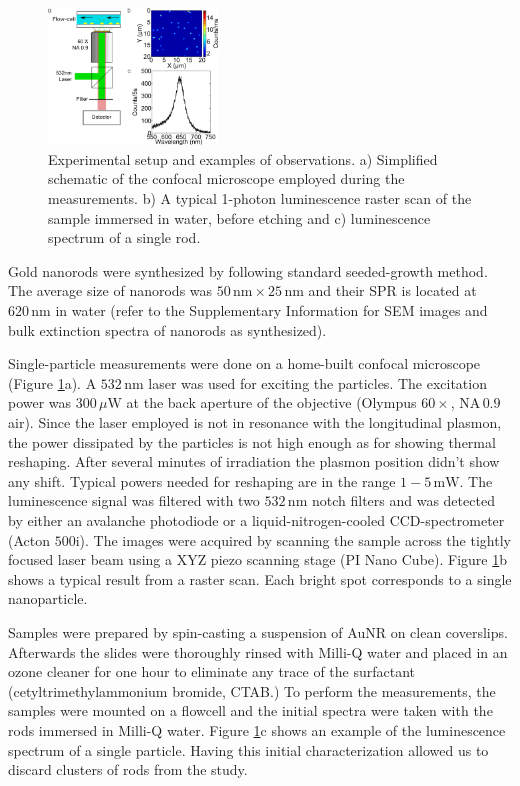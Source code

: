 \documentclass[twoside,twocolumn,11pt]{article}
\newcommand{\nm}{\ensuremath{\,\textrm{nm}}}
\newcommand{\uW}{\ensuremath{\,\mu\textrm{W}}}
\newcommand{\mW}{\ensuremath{\,\textrm{mW}}}
\begin{document}
\begin{figure}[htp]
 \centering
 \includegraphics[width=0.40\textwidth]{Figures/01_Setup/setup_1.png}
 \caption{Experimental setup and examples of observations. a) Simplified
 schematic of the confocal microscope employed during the measurements. b) A
 typical 1-photon luminescence raster scan of the sample immersed in
 water, before etching and c) luminescence spectrum of a single rod.}
 \label{fig:setup}
\end{figure}

Gold nanorods were synthesized by following standard seeded-growth
method\cite{Nikoobakht2003}. The average size of nanorods was $50\nm\times
25\nm$ and their SPR is located at $620\nm$ in water (refer to the
Supplementary Information for SEM images and bulk extinction spectra of nanorods
as synthesized).

Single-particle measurements were done on a home-built confocal microscope
(Figure \ref{fig:setup}a). A $532\nm$ laser was used for exciting the particles.
The excitation power was $300\uW$ at the back aperture of the objective (Olympus
$60\times$, $\textrm{NA}\,0.9$ air). Since the laser employed is not in
resonance with the longitudinal plasmon, the power dissipated by the particles
is not high enough as for showing thermal reshaping. After several minutes of
irradiation the plasmon position didn't show any shift. Typical powers needed
for reshaping are in the range $1-5\mW$\cite{Yorulmaz2012}. The luminescence
signal was filtered with two $532\nm$ notch filters and was detected by either
an avalanche photodiode or a liquid-nitrogen-cooled CCD-spectrometer (Acton
$500\textrm{i}$). The images were acquired by scanning the sample across the
tightly focused laser beam using a XYZ piezo scanning stage (PI Nano Cube).
Figure \ref{fig:setup}b shows a typical result from a raster scan. Each bright
spot corresponds to a single nanoparticle.

Samples were prepared by spin-casting a suspension of AuNR on clean coverslips.
Afterwards the slides were thoroughly rinsed with Milli-Q water and placed in an
ozone cleaner for one hour to eliminate any trace of the surfactant
(cetyltrimethylammonium bromide, CTAB.) To perform the measurements, the samples
were mounted on a flowcell and the initial spectra were taken with the rods
immersed in Milli-Q water. Figure \ref{fig:setup}c shows an example of the
luminescence spectrum of a single particle. Having this initial characterization
allowed us to discard clusters of rods\cite{Funston2009} from the study. 
\end{document}
